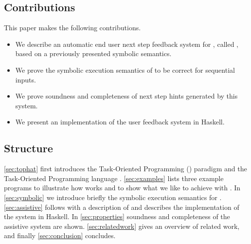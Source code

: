 \subsection{Contributions}

This paper makes the following contributions.

\begin{itemize}
  \item We describe an automatic end user next step feedback system for \TOPHAT, called \ASTOPHAT, based on a previously presented symbolic semantics.
  \item We prove the symbolic execution semantics of \TOPHAT to be correct for sequential inputs.
  \item We prove soundness and completeness of next step hints generated by this system.
  \item We present an implementation of the user feedback system in Haskell.
\end{itemize}


\subsection{Structure}

\cref{sec:tophat} first introduces the Task-Oriented Programming (\TOP) paradigm and the Task-Oriented Programming language \TOPHAT.
\cref{sec:examples} lists three example programs to illustrate how \TOPHAT works and to show what we like to achieve with \ASTOPHAT.
In \cref{sec:symbolic} we introduce briefly the symbolic execution semantics for \TOPHAT.
\cref{sec:assistive} follows with a description of \ASTOPHAT
and describes the implementation of the system in Haskell.
In \cref{sec:properties} soundness and completeness of the assistive system are shown.
\cref{sec:relatedwork} gives an overview of related work, and finally \cref{sec:conclusion} concludes.
